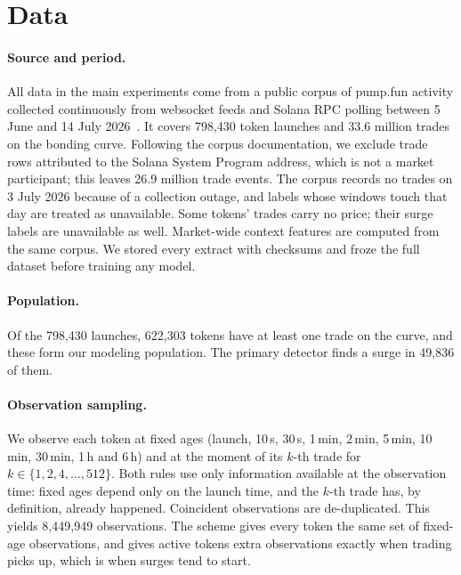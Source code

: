 \section{Data}
\label{sec:data}

\paragraph{Source and period.}
All data in the main experiments come from a public corpus of pump.fun activity collected continuously from websocket feeds and Solana RPC polling between 5 June and 14 July 2026~\citep{slinkdev2026corpus}. It covers 798,430 token launches and 33.6 million trades on the bonding curve. Following the corpus documentation, we exclude trade rows attributed to the Solana System Program address, which is not a market participant; this leaves 26.9 million trade events. The corpus records no trades on 3 July 2026 because of a collection outage, and labels whose windows touch that day are treated as unavailable. Some tokens' trades carry no price; their surge labels are unavailable as well. Market-wide context features are computed from the same corpus. We stored every extract with checksums and froze the full dataset before training any model.

\paragraph{Population.}
Of the 798,430 launches, 622,303 tokens have at least one trade on the curve, and these form our modeling population. The primary detector finds a surge in 49,836 of them.

\paragraph{Observation sampling.}
We observe each token at fixed ages (launch, 10\,s, 30\,s, 1\,min, 2\,min, 5\,min, 10\,min, 30\,min, 1\,h and 6\,h) and at the moment of its $k$-th trade for $k \in \{1, 2, 4, \ldots, 512\}$. Both rules use only information available at the observation time: fixed ages depend only on the launch time, and the $k$-th trade has, by definition, already happened. Coincident observations are de-duplicated. This yields 8,449,949 observations. The scheme gives every token the same set of fixed-age observations, and gives active tokens extra observations exactly when trading picks up, which is when surges tend to start.

